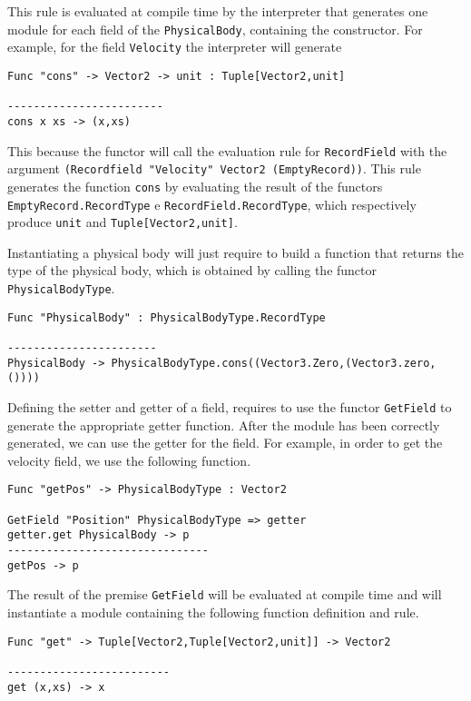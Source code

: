 This rule is evaluated at compile time by the interpreter that generates one module for each field of the \texttt{PhysicalBody}, containing the constructor. For example, for the field \texttt{Velocity} the interpreter will generate

\begin{lstlisting}
Func "cons" -> Vector2 -> unit : Tuple[Vector2,unit]

------------------------
cons x xs -> (x,xs)
\end{lstlisting}

This because the functor will call the evaluation rule for \texttt{RecordField} with the argument \texttt{(Recordfield "Velocity" Vector2 (EmptyRecord))}. This rule generates the function \texttt{cons} by evaluating the result of the functors \texttt{EmptyRecord.RecordType} e \texttt{RecordField.RecordType}, which respectively produce \texttt{unit} and \texttt{Tuple[Vector2,unit]}.

Instantiating a physical body will just require to build a function that returns the type of the physical body, which is obtained by calling the functor \texttt{PhysicalBodyType}.

\begin{lstlisting}
Func "PhysicalBody" : PhysicalBodyType.RecordType

-----------------------
PhysicalBody -> PhysicalBodyType.cons((Vector3.Zero,(Vector3.zero,())))
\end{lstlisting}

Defining the setter and getter of a field, requires to use the functor \texttt{GetField} to generate the appropriate getter function. After the module has been correctly generated, we can use the getter for the field. For example, in order to get the velocity field, we use the following function.

\begin{lstlisting}
Func "getPos" -> PhysicalBodyType : Vector2

GetField "Position" PhysicalBodyType => getter
getter.get PhysicalBody -> p
-------------------------------
getPos -> p
\end{lstlisting}

The result of the premise \texttt{GetField} will be evaluated at compile time and will instantiate a module containing the following function definition and rule.

\begin{lstlisting}
Func "get" -> Tuple[Vector2,Tuple[Vector2,unit]] -> Vector2

-------------------------
get (x,xs) -> x
\end{lstlisting}


